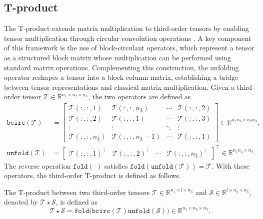 \documentclass[onefignum,onetabnum]{siamart250211}
\begin{document}
\subsection{T-product} The T-product extends matrix multiplication to third-order tensors by enabling tensor multiplication through circular convolution operations \cite{braman2010third,kilmer2013third,kilmer2011factorization}. A key component of this framework is the use of block-circulant operators, which represent a tensor as a structured block matrix whose multiplication can be performed using standard matrix operations. Complementing this construction, the unfolding operator reshapes a tensor into a block column matrix,  establishing a bridge between tensor representations and classical matrix multiplication. Given a third-order tensor $\mathscr{T}\in\mathbb{R}^{n_1\times n_2\times n_3}$, the two operators are defined as 
\begin{align*}
\texttt{bcirc}(\mathscr{T}) &= 
\begin{bmatrix}
\mathscr{T}(:,:,1) & \mathscr{T}(:,:,n_3) & \cdots & \mathscr{T}(:,:,2)\\
\mathscr{T}(:,:,2) & \mathscr{T}(:,:,1) & \cdots & \mathscr{T}(:,:,3)\\
\vdots & \vdots & \ddots & \vdots\\
\mathscr{T}(:,:,n_3) & \mathscr{T}(:,:,n_3-1) & \cdots & \mathscr{T}(:,:,1)
\end{bmatrix}\in\mathbb{R}^{n_1n_3\times n_2n_3}, \\
\texttt{unfold}(\mathscr{T}) &= 
\begin{bmatrix}
\mathscr{T}(:,:,1)^\top &
\mathscr{T}(:,:,2)^\top &
\cdots &
\mathscr{T}(:,:,n_3)^\top
\end{bmatrix}^\top\in\mathbb{R}^{n_1n_3\times n_2}.
\end{align*}
The reverse operation $\texttt{fold}(\cdot)$ satisfies $\texttt{fold}(\texttt{unfold}(\mathscr{T}))=\mathscr{T}$.  
With these operators, the third-order T-product is defined as follows. 

\begin{definition} [T-product] \label{def:3rdtprod}
The T-product between two third-order tensors $\mathscr{T}\in\mathbb{R}^{n_1\times l\times n_3}$ and $\mathscr{S}\in\mathbb{R}^{l\times n_2\times n_3}$, denoted by $\mathscr{T}\star\mathscr{S}$, is defined as 
\begin{equation*}
\mathscr{T}\star\mathscr{S} = \texttt{fold}\big(\texttt{bcirc}(\mathscr{T})\texttt{unfold}(\mathscr{S})\big) \in\mathbb{R}^{n_1\times n_2\times n_3}.
\end{equation*}
\end{definition}
\end{document}
